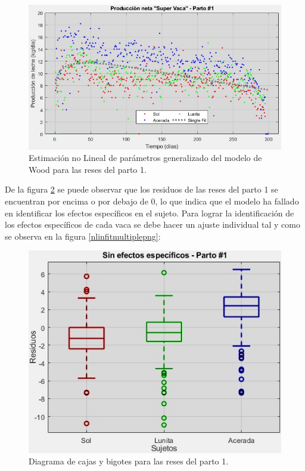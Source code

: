 \begin{figure}[H]
	 \begin{center}
	 \includegraphics[scale=0.69]{img/nlinfit1spa.jpg}
	 \end{center}
	 \caption{Estimación no Lineal de parámetros generalizado del modelo de Wood para las reses del parto 1. \label{nlinfit1png}}
\end{figure}

De la figura \ref{nlinfitbox1png} se puede observar que los residuos de las reses del parto 1 se encuentran por encima o por debajo de 0, lo que indica que el modelo ha fallado en identificar los efectos específicos en el sujeto. Para lograr la identificación de los efectos específicos de cada vaca se debe hacer un ajuste individual tal y como se observa en la figura \ref{nlinfitmultiplepng}:

\begin{figure}[H]
	 \begin{center}
	 \includegraphics[scale=0.7]{img/nlinfitbox1spa.jpg}
	 \end{center}
	 \caption{Diagrama de cajas y bigotes para las reses del parto 1. \label{nlinfitbox1png}}
\end{figure}

